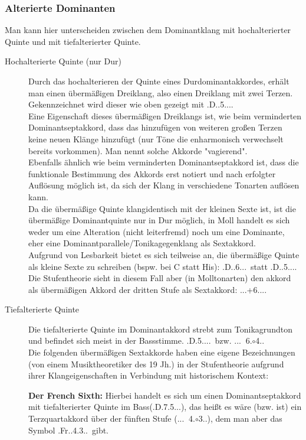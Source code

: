 \documentclass[a4paper]{article}
\newcommand{\dShoch}[4]{\HH.\uppercase\expandafter{\romannumeral #1\relax}..#2.#3.#4.} %
\newcommand{\bel}[5]{\HH.#1.#5.#2.#3.#4.}
\newcommand{\Dhoch}[2]{\HH.D.#2.#1...}
\begin{document}
	\subsubsection{Alterierte Dominanten}
	Man kann hier unterscheiden zwischen dem Dominantklang mit hochalterierter Quinte und mit tiefalterierter Quinte.
	\begin{description}
		\item[Hochalterierte Quinte (nur Dur)] Durch das hochalterieren der Quinte eines Durdominantakkordes, erhält man einen übermäßigen Dreiklang, also einen Dreiklang mit zwei Terzen. Gekennzeichnet wird dieser wie oben gezeigt mit \Dhoch{5\UB}{}.\\ 
		Eine Eigenschaft dieses übermäßigen Dreiklangs ist, wie beim verminderten Dominantseptakkord, dass das hinzufügen von weiteren großen Terzen keine neuen Klänge hinzufügt (nur Töne die enharmonisch verwechselt bereits vorkommen). Man nennt solche Akkorde "vagierend".\\
		Ebenfalls ähnlich wie beim verminderten Dominantseptakkord ist, dass die funktionale Bestimmung des Akkords erst notiert und nach erfolgter Auflösung möglich ist, da sich der Klang in verschiedene Tonarten auflösen kann.\\
		Da die übermäßige Quinte klangidentisch mit der kleinen Sexte ist, ist die übermäßige Dominantquinte nur in Dur möglich, in Moll handelt es sich weder um eine Alteration (nicht leiterfremd) noch um eine Dominante, eher eine Dominantparallele/Tonikagegenklang als Sextakkord.\\
		Aufgrund von Lesbarkeit bietet es sich teilweise an, die übermäßige Quinte als kleine Sexte zu schreiben (bspw. bei C statt His): \Dhoch{6\VM}{}\ statt \Dhoch{5\UB}{}. Die Stufentheorie sieht in diesem Fall aber (in Molltonarten) den akkord als übermäßigen Akkord der dritten Stufe als Sextakkord: \dShoch{3}{+6}{}{}.
		
		\item[Tiefalterierte Quinte] Die tiefalterierte Quinte im Dominantakkord strebt zum Tonikagrundton und befindet sich meist in der Bassstimme. \Dhoch{}{5\VM}\ bzw. \dShoch{5}{$\:$ 6}{$\circ$4}{}\\
		Die folgenden übermäßigen Sextakkorde haben eine eigene Bezeichnungen (von einem Musiktheoretiker des 19 Jh.) in der Stufentheorie aufgrund ihrer Klangeigenschaften in Verbindung mit historischem Kontext:
		
		\subitem \textbf{Der French Sixth:} Hierbei handelt es sich um einen Dominantseptakkord mit tiefalterierter Quinte im Bass(\Dhoch{5\VM}{7}), das heißt es wäre (bzw. ist) ein Terzquartakkord über der fünften Stufe (\dShoch{5}{$\:$ 4}{$\circ$3}{}), dem man aber das Symbol \bel{Fr}{4}{3}{}{}\ gibt.
		

\end{description}
\end{document}

